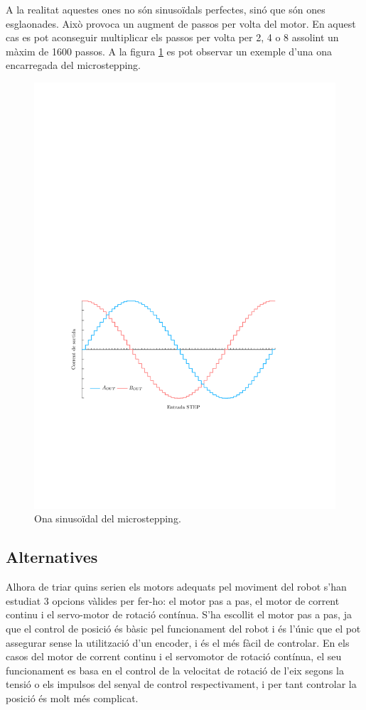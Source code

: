 \begin{itemize}
	A la realitat aquestes ones no són sinusoïdals perfectes, sinó que són ones esglaonades. Això provoca un augment de passos per volta del motor. En aquest cas es pot aconseguir multiplicar els passos per volta per 2, 4 o 8 assolint un màxim de 1600 passos. A la figura \ref{fig:Microstepping} es pot observar un exemple d’una ona encarregada del microstepping. 
	
	\begin{figure}[H]
		\centering
		\includegraphics{Multistepper-grafic}
		\caption{Ona sinusoïdal del microstepping.}
		\label{fig:Microstepping}
	\end{figure}
\end{itemize}

\subsection{Alternatives}
Alhora de triar quins serien els motors adequats pel moviment del robot s'han estudiat 3 opcions vàlides per fer-ho: el motor pas a pas, el motor de corrent continu i el servo-motor de rotació contínua. S'ha escollit el motor pas a pas, ja que el control de posició és bàsic pel funcionament del robot i és l'únic que el pot assegurar sense la utilització d'un encoder, i és el més fàcil de controlar. En els casos del motor de corrent continu i el servomotor de rotació contínua, el seu funcionament es basa en el control de la velocitat de rotació de l'eix segons la tensió o els impulsos del senyal de control respectivament, i per tant controlar la posició és molt més complicat. 


